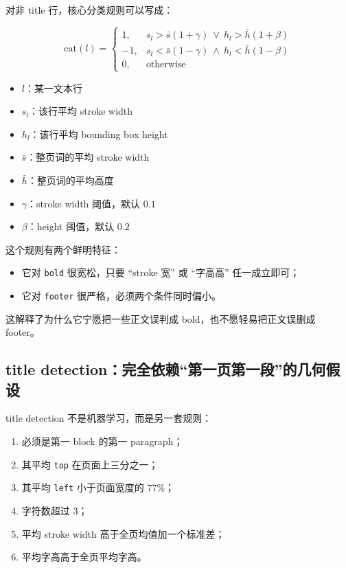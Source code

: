 \documentclass[a4paper]{article}
\begin{document}
对非 title 行，核心分类规则可以写成：

$$
\text{cat}(l)=
\begin{cases}
1, & s_l > \bar{s}(1+\gamma) \ \lor\  h_l > \bar{h}(1+\beta) \\
-1, & s_l < \bar{s}(1-\gamma) \ \land\ h_l < \bar{h}(1-\beta) \\
0, & \text{otherwise}
\end{cases}
$$

\begin{itemize}
\item $l$：某一文本行
\item $s_l$：该行平均 stroke width
\item $h_l$：该行平均 bounding box height
\item $\bar{s}$：整页词的平均 stroke width
\item $\bar{h}$：整页词的平均高度
\item $\gamma$：stroke width 阈值，默认 $0.1$
\item $\beta$：height 阈值，默认 $0.2$
\end{itemize}

这个规则有两个鲜明特征：

\begin{itemize}
\item 它对 \texttt{bold} 很宽松，只要 “stroke 宽” 或 “字高高” 任一成立即可；
\item 它对 \texttt{footer} 很严格，必须两个条件同时偏小。
\end{itemize}

这解释了为什么它宁愿把一些正文误判成 bold，也不愿轻易把正文误删成 footer。

\subsection{title detection：完全依赖“第一页第一段”的几何假设}

title detection 不是机器学习，而是另一套规则：

\begin{enumerate}
\item 必须是第一 block 的第一 paragraph；
\item 其平均 \texttt{top} 在页面上三分之一；
\item 其平均 \texttt{left} 小于页面宽度的 $77\%$；
\item 字符数超过 3；
\item 平均 stroke width 高于全页均值加一个标准差；
\item 平均字高高于全页平均字高。
\end{enumerate}
\end{document}
